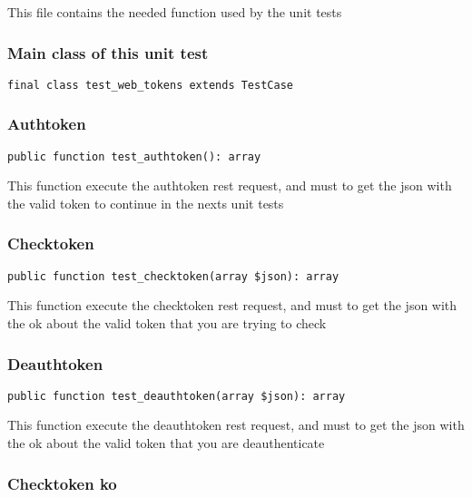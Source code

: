 \documentclass[a4paper]{article}
\begin{document}
This file contains the needed function used by the unit tests

\hypertarget{toc419}{}
\subsubsection{Main class of this unit test}

\begin{lstlisting}
final class test_web_tokens extends TestCase
\end{lstlisting}

\hypertarget{toc420}{}
\subsubsection{Authtoken}

\begin{lstlisting}
public function test_authtoken(): array
\end{lstlisting}

This function execute the authtoken rest request, and must to get the
json with the valid token to continue in the nexts unit tests

\hypertarget{toc421}{}
\subsubsection{Checktoken}

\begin{lstlisting}
public function test_checktoken(array $json): array
\end{lstlisting}

This function execute the checktoken rest request, and must to get the
json with the ok about the valid token that you are trying to check

\hypertarget{toc422}{}
\subsubsection{Deauthtoken}

\begin{lstlisting}
public function test_deauthtoken(array $json): array
\end{lstlisting}

This function execute the deauthtoken rest request, and must to get the
json with the ok about the valid token that you are deauthenticate

\hypertarget{toc423}{}
\subsubsection{Checktoken ko}
\end{document}
